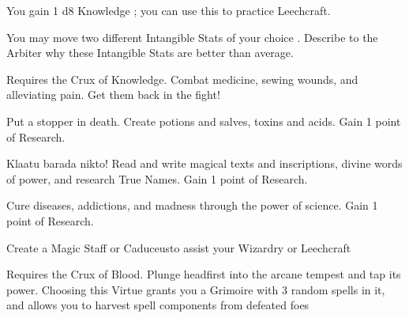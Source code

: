 {  You gain 1 d8 Knowledge \STATIC; you can use this \STATIC to practice Leechcraft.\footnotemark[\value{footnote}]


    You may move two different Intangible Stats of your choice \DCUP.  Describe to the Arbiter why these Intangible Stats are better than average.


  Requires the Crux of Knowledge.  Combat medicine, sewing wounds, and alleviating pain.  Get them back in the fight!
 

  Put a stopper in death.  Create potions and salves, toxins and acids. Gain 1 point of Research.\footnotemark[\value{footnote}]

  
  Klaatu barada nikto! Read and write magical texts and inscriptions, divine words of power, and research True Names. Gain 1 point of Research.\footnotemark[\value{footnote}]


  Cure diseases, addictions, and madness through the power of science. Gain 1 point of Research.\footnotemark[\value{footnote}]


    Create a Magic Staff or Caduceus\footnotemark[\value{footnote}] to assist your Wizardry or Leechcraft


  Requires the Crux of Blood. Plunge headfirst into the arcane tempest and tap its power.  Choosing this Virtue grants you a Grimoire with 3 random spells in it, and allows you to harvest spell components from defeated foes\footnotemark[\value{footnote}]

  \setcounter{footnote}{0}



}
